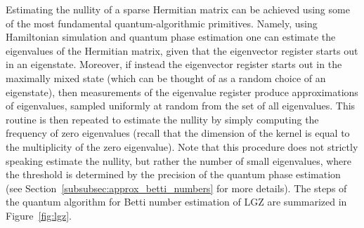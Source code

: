 \documentclass[a4paper, onecolumn, accepted=2022-08-28]{quantumarticle}
\begin{document}
Estimating the nullity of a sparse Hermitian matrix can be achieved using some of the most fundamental quantum-algorithmic primitives. 
Namely, using Hamiltonian simulation and quantum phase estimation one can estimate the eigenvalues of the Hermitian matrix, given that the eigenvector register starts out in an eigenstate.
Moreover, if instead the eigenvector register starts out in the maximally mixed state (which can be thought of as a random choice of an eigenstate), then measurements of the eigenvalue register produce approximations of eigenvalues, sampled uniformly at random from the set of all eigenvalues.
This routine is then repeated to estimate the nullity by simply computing the frequency of zero eigenvalues (recall that the dimension of the kernel is equal to the multiplicity of the zero eigenvalue).
Note that this procedure does not strictly speaking estimate the nullity, but rather the number of small eigenvalues, where the threshold is determined by the precision of the quantum phase estimation (see Section~\ref{subsubsec:approx_betti_numbers} for more details).
The steps of the quantum algorithm for Betti number estimation of LGZ are summarized in Figure~\ref{fig:lgz}.
\end{document}
